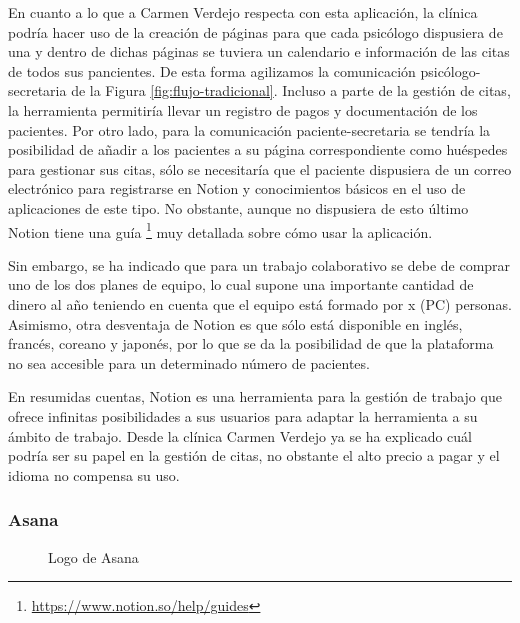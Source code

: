 En cuanto a lo que a Carmen Verdejo respecta con esta aplicación, la clínica podría hacer uso de la creación de páginas para que cada psicólogo dispusiera de una y dentro de dichas páginas se tuviera un calendario e información de las citas de todos sus pancientes. De esta forma agilizamos la comunicación psicólogo-secretaria de la Figura \ref{fig:flujo-tradicional}. Incluso a parte de la gestión de citas, la herramienta permitiría llevar un registro de pagos y documentación de los pacientes. Por otro lado, para la comunicación paciente-secretaria se tendría la posibilidad de añadir a los pacientes a su página correspondiente como huéspedes para gestionar sus citas, sólo se necesitaría que el paciente dispusiera de un correo electrónico para registrarse en Notion y conocimientos básicos en el uso de aplicaciones de este tipo. No obstante, aunque no dispusiera de esto último Notion tiene una guía \footnote{\url{https://www.notion.so/help/guides}} muy detallada sobre cómo usar la aplicación. \bigskip

Sin embargo, se ha indicado que para un trabajo colaborativo se debe de comprar uno de los dos planes de equipo, lo cual supone una importante cantidad de dinero al año teniendo en cuenta que el equipo está formado por x (PC) personas. Asimismo, otra desventaja de Notion es que sólo está disponible en inglés, francés, coreano y japonés, por lo que se da la posibilidad de que la plataforma no sea accesible para un determinado número de pacientes. \bigskip

En resumidas cuentas, Notion es una herramienta para la gestión de trabajo que ofrece infinitas posibilidades a sus usuarios para adaptar la herramienta a su ámbito de trabajo. Desde la clínica Carmen Verdejo ya se ha explicado cuál podría ser su papel en la gestión de citas, no obstante el alto precio a pagar y el idioma no compensa su uso. 

\subsubsection*{Asana}
\begin{figure}[H]
    \caption{Logo de Asana}
    \label{fig:logo-asana}
\end{figure}

